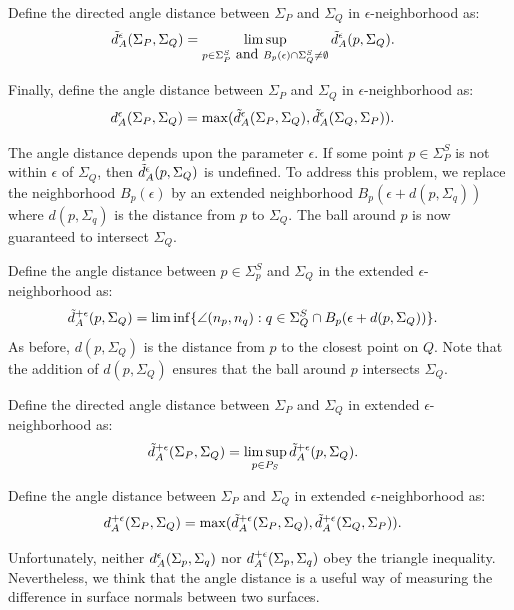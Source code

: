 Define the directed angle distance between $\Sigma_P$ and $\Sigma_Q$
in $\epsilon$-neighborhood as:
\begin{align*}
\tilde{d}_A^\epsilon(\Sigma_P,\Sigma_Q) & = 
  \limsup_{p \in \Sigma^S_P \mbox{ and } 
  B_p(\epsilon) \cap \Sigma^S_Q \neq \emptyset} 
         \tilde{d}_A^\epsilon(p,\Sigma_Q).
\end{align*}

Finally, define the angle distance between $\Sigma_P$ and $\Sigma_Q$
in $\epsilon$-neighborhood as:
\begin{align*}
d_A^\epsilon(\Sigma_P,\Sigma_Q) & = 
\max(\tilde{d}_A^\epsilon(\Sigma_P,\Sigma_Q), \tilde{d}_A^\epsilon(\Sigma_Q,\Sigma_P)).
\end{align*}

The angle distance depends upon the parameter $\epsilon$.
If some point $p \in \Sigma^S_P$ is not within $\epsilon$ of $\Sigma_Q$,
then $\tilde{d}_A^\epsilon(p,\Sigma_Q)$ is undefined.
To address this problem, we replace the neighborhood $B_p(\epsilon)$
by an extended neighborhood $B_p(\epsilon+d(p,\Sigma_q))$
where $d(p,\Sigma_q)$ is the distance from $p$ to $\Sigma_Q$.
The ball around $p$ is now guaranteed to intersect $\Sigma_Q$.

Define the angle distance 
between $p \in \Sigma^S_p$ and $\Sigma_Q$ in the extended
$\epsilon$-neighborhood as:
\begin{align*}
\tilde{d}_A^{+\epsilon}(p,\Sigma_Q) & = 
  \liminf\{ \angle(n_p, n_q) : 
     q \in \Sigma^S_Q \cap B_p(\epsilon+d(p,\Sigma_Q)) \}.
\end{align*}
As before, $d(p,\Sigma_Q)$ is the distance from $p$ to the closest point on $Q$.
Note that the addition of $d(p,\Sigma_Q)$ ensures that the ball
around $p$ intersects $\Sigma_Q$.

Define the directed angle distance between $\Sigma_P$ and $\Sigma_Q$
in extended $\epsilon$-neighborhood as:
\begin{align*}
\tilde{d}_A^{+\epsilon}(\Sigma_P,\Sigma_Q) & = \limsup_{p \in P_S} \tilde{d}_A^{+\epsilon}(p,\Sigma_Q).
\end{align*}

Define the angle distance between $\Sigma_P$ and $\Sigma_Q$
in extended $\epsilon$-neighborhood as:
\begin{align*}
d_A^{+\epsilon}(\Sigma_P,\Sigma_Q) & = 
\max(\tilde{d}_A^{+\epsilon}(\Sigma_P,\Sigma_Q), \tilde{d}_A^{+\epsilon}(\Sigma_Q,\Sigma_P)).
\end{align*}

Unfortunately, neither $d_A^\epsilon(\Sigma_p, \Sigma_q)$
nor $d_A^{+\epsilon}(\Sigma_p, \Sigma_q)$ obey the triangle inequality.
Nevertheless, we think that the angle distance is a useful way
of measuring the difference in surface normals between two surfaces.

